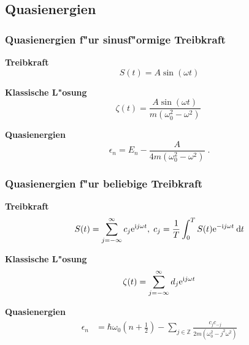 \subsection{Quasienergien}
\begin{frame}
  \frametitle{Quasienergien f"ur sinusf"ormige Treibkraft}
  \textbf{Treibkraft}
  \begin{equation}
    S(t)=A\sin(\omega t)
  \end{equation}

  \textbf{Klassische L"osung}
  \begin{equation}
    \zeta(t) = \frac{A\sin(\omega t)}{m(\omega_0^2 - \omega^2)} \;
  \end{equation}

  \textbf{Quasienergien}
  \begin{equation}
    \epsilon_n  = E_n - \frac{A}{4m(\omega_0^2-\omega^2)} \;.
  \end{equation}
\end{frame}

\begin{frame}
  \frametitle{Quasienergien f"ur beliebige Treibkraft}
  \textbf{Treibkraft}%
  \begin{equation}
    S(t) = \sum_{j=-\infty}^\infty c_j \text e^{\text ij\omega t}, \; c_j = \frac{1}{T} \int_0^T S(t) \text e^{-\text ij\omega t} \: \text d t
  \end{equation}

  \textbf{Klassische L"osung}
  \begin{equation}
    \zeta(t) = \sum_{j=-\infty}^\infty d_j \text e^{\text ij\omega t}
  \end{equation}


  \textbf{Quasienergien}
  \begin{align}
    \begin{split}
      \epsilon_n &= \hbar \omega_0\left(n+\frac{1}{2}\right) - \sum_{j \in \mathbb Z} \frac{c_jc_{-j}}{2m(\omega_0^2-j^2\omega^2)}
    \end{split}
  \end{align}

\end{frame}



